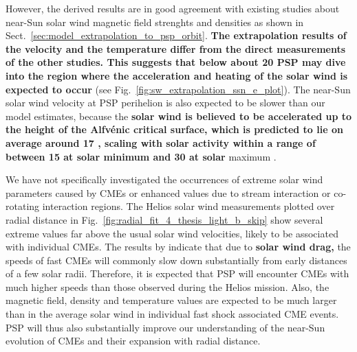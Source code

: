 However, the derived results are in good agreement with existing studies about near-Sun solar wind magnetic field strenghts and densities as shown in Sect.~\ref{sec:model_extrapolation_to_psp_orbit}. \textbf{The extrapolation results of the velocity and the temperature differ from the direct measurements of the other studies. This suggests that below about \SI{20}{\Rs} PSP may dive into the region where the acceleration and heating of the solar wind is expected to occur} (see Fig.~\ref{fig:sw_extrapolation_ssn_e_plot}). The near-Sun solar wind velocity at PSP perihelion is also expected to be slower than our model estimates, because the \textbf{solar wind is believed to be accelerated up to the height of the Alfvénic critical surface, which is predicted to lie on average around \SI{17}{\Rs} \citep[e.g.,][]{Sittler1999,Exarhos2000}, scaling with solar activity within a range of between \SI{15}{\Rs} at solar minimum and \SI{30}{\Rs} at solar} maximum \citep{Katsikas2010,Goelzer2014}.	%

We have not specifically investigated the occurrences of extreme solar wind parameters caused by CMEs or enhanced values due to stream interaction or co-rotating interaction regions. The Helios solar wind measurements plotted over radial distance in Fig.~\ref{fig:radial_fit_4_thesis_light_b_skip} show several extreme values far above the usual solar wind velocities, likely to be associated with individual CMEs. The results by \citet{Sachdeva2017} indicate that due to \textbf{solar wind drag,} the speeds of fast CMEs will commonly slow down substantially from early distances of a few solar radii. Therefore, it is expected that PSP will encounter CMEs with much higher speeds than those observed during the Helios mission. Also, the magnetic field, density and temperature values are expected to be much larger than in the average solar wind in individual fast shock associated CME events. PSP will thus also substantially improve our understanding of the near-Sun evolution of CMEs and their expansion with radial distance.



